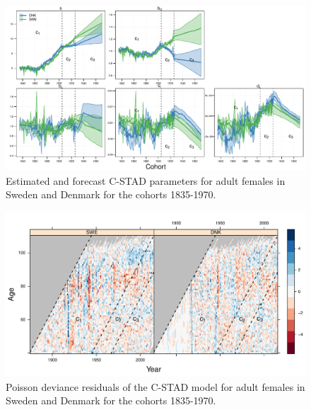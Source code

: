 \documentclass[11pt, a4paper]{article}
\begin{document}
\begin{landscape}
	\begin{figure}[h!]
		\begin{center}
			\includegraphics[scale=0.92]{./Figures/FA1.pdf} 
			\caption{Estimated and forecast C-STAD parameters for adult females in Sweden and Denmark for the cohorts 1835-1970.\label{Fig:CSTADparams}}    
		\end{center}
	\end{figure}
\end{landscape}
 
\begin{landscape}
	\begin{figure}[h!]
		\begin{center}
			\includegraphics[scale=0.92]{./Figures/FA2.pdf} 
			\caption{Poisson deviance residuals of the C-STAD model for adult females in Sweden and Denmark for the cohorts 1835-1970.\label{Fig:CSTADresid}}    
		\end{center}
	\end{figure}
\end{landscape}


 
\end{document}
